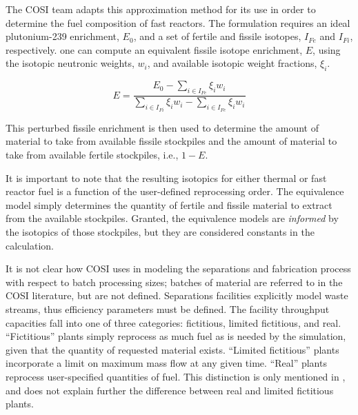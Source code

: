 The COSI team adapts this approximation method for its use in order to determine
the fuel composition of fast reactors. The formulation requires an ideal
plutonium-239 enrichment, $E_0$, and a set of fertile and fissile isotopes,
$I_{Fe}$ and $I_{Fi}$, respectively. one can compute an equivalent fissile
isotope enrichment, $E$, using the isotopic neutronic weights, $w_i$, and
available isotopic weight fractions, $\xi_i$.

\begin{equation*}
E = \frac{E_0 - \sum_{i \in I_{Fe}} \xi_i w_i}
         {\sum_{i \in I_{Fi}} \xi_i w_i - \sum_{i \in I_{Fe}} \xi_i w_i}
\end{equation*}

This perturbed fissile enrichment is then used to determine the amount of
material to take from available fissile stockpiles and the amount of material to
take from available fertile stockpiles, i.e., $1 - E$.

It is important to note that the resulting isotopics for either thermal or fast
reactor fuel is a function of the user-defined reprocessing order. The
equivalence model simply determines the quantity of fertile and fissile material
to extract from the available stockpiles. Granted, the equivalence models
are \textit{informed} by the isotopics of those stockpiles, but they are
considered constants in the calculation. 

It is not clear how COSI uses in modeling the separations and fabrication
process with respect to batch processing sizes; batches of material are referred
to in the COSI literature, but are not defined. Separations facilities
explicitly model waste streams, thus efficiency parameters must be defined. The
facility throughput capacities fall into one of three categories: fictitious,
limited fictitious, and real. ``Fictitious'' plants simply reprocess as much
fuel as is needed by the simulation, given that the quantity of requested
material exists. ``Limited fictitious'' plants incorporate a limit on maximum
mass flow at any given time. ``Real'' plants reprocess user-specified quantities
of fuel. This distinction is only mentioned in \cite{guerin_benchmark_2009}, and
does not explain further the difference between real and limited fictitious
plants.
